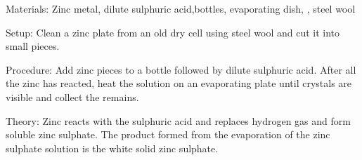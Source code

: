 \begin{multicols}{2}
\begin{description*}
\item[Materials:]{Zinc metal, dilute sulphuric acid,bottles, evaporating dish, , steel wool}
\item[Setup:]{Clean a zinc plate from an old dry cell using steel wool and cut it into small pieces.}
\item[Procedure:]{Add zinc pieces to a bottle followed by dilute sulphuric acid. After all the zinc has reacted, heat the solution on an evaporating plate until crystals are visible and collect the remains.}
\item[Theory:]{Zinc reacts with the sulphuric acid and replaces hydrogen gas and form soluble zinc sulphate. The product formed from the evaporation of the zinc
sulphate solution is the white solid zinc sulphate.}
\end{description*}


\end{multicols}

\vfill
\pagebreak